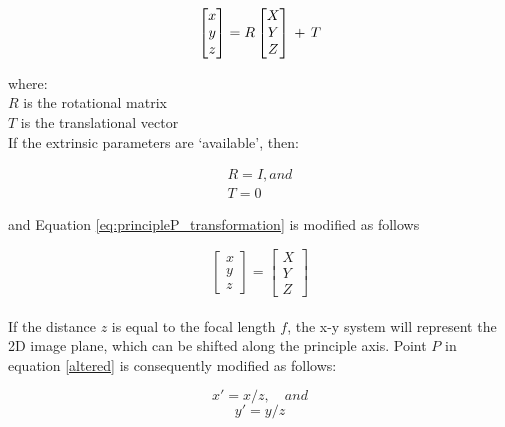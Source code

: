 \begin{equation}\label{eq:principleP_transformation}
\begin{bmatrix}{x}\\{y}\\{z}\end{bmatrix} = R  \begin{bmatrix}{X}\\{Y}\\{Z}\end{bmatrix}\,+\,T\\
\end{equation}

where:\\
$R$ is the rotational matrix\\
$T$ is the translational vector\\

If the extrinsic parameters are `available', then:

\begin{align*}
R = I, and\\
T = 0
\end{align*}

and Equation \ref{eq:principleP_transformation} is modified as follows 

\begin{equation}\label{altered}
\begin{bmatrix}{x}\\{y}\\{z}\end{bmatrix} =  \begin{bmatrix}{X}\\{Y}\\{Z}\end{bmatrix}
\end{equation}\\

If the distance $z$ is equal to the focal length $f$, the x-y system will represent the 2D image plane, which can be shifted along the principle axis. Point $P$ in equation \ref{altered} is consequently modified as follows:


\begin{equation}x' = x/z,\quad and \end{equation}
\begin{equation}y' = y/z \end{equation}

